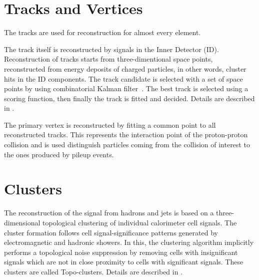 \section{Tracks and Vertices}
The tracks are used for reconstruction for almost every element.

The track itself is reconstructed by signals in the Inner Detector (ID).
Reconstruction of tracks starts from three-dimentional space points, reconstructed from energy deposits of charged particles, in other words, cluster hits in the ID components. 
The track candidate is selected with a set of space points by using combinatorial Kalman filter~\cite{FRUHWIRTH1987444}. 
The best track is selected using a scoring function, then finally the track is fitted and decided. Details are described in \cite{PERF-2015-08}.

The primary vertex is reconstructed by fitting a common point to all reconstructed tracks. This represents the interaction point of the proton-proton collision and is used distinguish particles coming from the collision of interest to the ones produced by pileup events.

\section{Clusters} %
The reconstruction of the signal from hadrons and jets is based on a three-dimensional topological clustering of individual calorimeter cell signals.
The cluster formation follows cell signal-significance patterns generated by electromagnetic and hadronic showers. In this, the clustering algorithm implicitly performs a topological noise suppression by removing cells with insignificant signals which are not in close proximity to cells with significant signals. These clusters are called Topo-clusters. Details are described in \cite{PERF-2014-07}.

